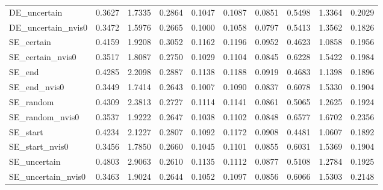 \begin{tabular}{lrrrrrrrrr}
DE_uncertain & 0.3627 & 1.7335 & 0.2864 & 0.1047 & 0.1087 & 0.0851 & 0.5498 & 1.3364 & 0.2029 \\
DE_uncertain_nvis0 & 0.3472 & 1.5976 & 0.2665 & 0.1000 & 0.1058 & 0.0797 & 0.5413 & 1.3562 & 0.1826 \\
SE_certain & 0.4159 & 1.9208 & 0.3052 & 0.1162 & 0.1196 & 0.0952 & 0.4623 & 1.0858 & 0.1956 \\
SE_certain_nvis0 & 0.3517 & 1.8087 & 0.2750 & 0.1029 & 0.1104 & 0.0845 & 0.6228 & 1.5422 & 0.1984 \\
SE_end & 0.4285 & 2.2098 & 0.2887 & 0.1138 & 0.1188 & 0.0919 & 0.4683 & 1.1398 & 0.1896 \\
SE_end_nvis0 & 0.3449 & 1.7414 & 0.2643 & 0.1007 & 0.1090 & 0.0837 & 0.6078 & 1.5330 & 0.1904 \\
SE_random & 0.4309 & 2.3813 & 0.2727 & 0.1114 & 0.1141 & 0.0861 & 0.5065 & 1.2625 & 0.1924 \\
SE_random_nvis0 & 0.3537 & 1.9222 & 0.2647 & 0.1038 & 0.1102 & 0.0848 & 0.6577 & 1.6702 & 0.2356 \\
SE_start & 0.4234 & 2.1227 & 0.2807 & 0.1092 & 0.1172 & 0.0908 & 0.4481 & 1.0607 & 0.1892 \\
SE_start_nvis0 & 0.3456 & 1.7850 & 0.2660 & 0.1045 & 0.1101 & 0.0855 & 0.6031 & 1.5369 & 0.1904 \\
SE_uncertain & 0.4803 & 2.9063 & 0.2610 & 0.1135 & 0.1112 & 0.0877 & 0.5108 & 1.2784 & 0.1925 \\
SE_uncertain_nvis0 & 0.3463 & 1.9024 & 0.2644 & 0.1052 & 0.1097 & 0.0856 & 0.6066 & 1.5303 & 0.2148 \\
\bottomrule
\end{tabular}
